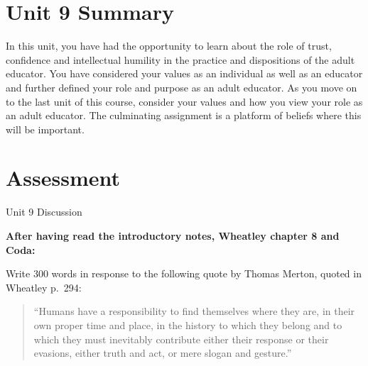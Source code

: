 \documentclass[
]{book}
\begin{document}
\hypertarget{unit-9-summary}{%
\section*{Unit 9 Summary}\label{unit-9-summary}}

In this unit, you have had the opportunity to learn about the role of trust, confidence and intellectual humility in the practice and dispositions of the adult educator. You have considered your values as an individual as well as an educator and further defined your role and purpose as an adult educator. As you move on to the last unit of this course, consider your values and how you view your role as an adult educator. The culminating assignment is a platform of beliefs where this will be important.

\hypertarget{assessment-8}{%
\section*{Assessment}\label{assessment-8}}

\begin{assessment}
{Unit 9 Discussion}

\textbf{After having read the introductory notes, Wheatley chapter 8 and
Coda:}

Write 300 words in response to the following quote by Thomas Merton,
quoted in Wheatley p.~294:

\begin{quote}
``Humans have a responsibility to find themselves where they are, in
their own proper time and place, in the history to which they belong and
to which they must inevitably contribute either their response or their
evasions, either truth and act, or mere slogan and gesture.''
\end{quote}
\end{assessment}
\end{document}
